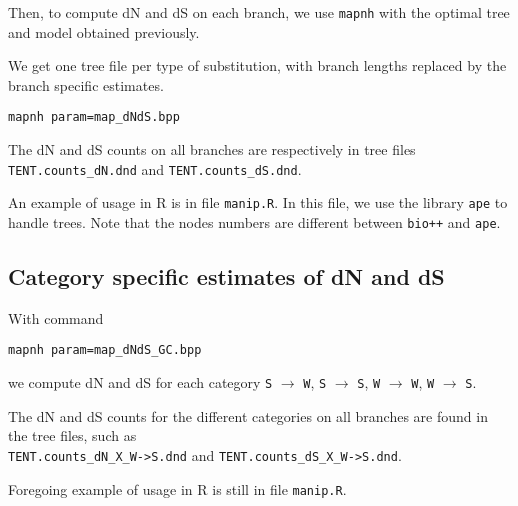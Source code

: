 \documentclass[11pt, a4paper]{article}
\begin{document}
Then, to compute dN and dS on each branch, we use \texttt{mapnh} with
the optimal tree and model obtained previously.

We get one tree file per type of substitution, with branch lengths
replaced by the branch specific estimates.

\begin{verbatim}
mapnh param=map_dNdS.bpp
\end{verbatim}

The dN and dS counts on all branches are respectively in tree files
\\ 
\verb|TENT.counts_dN.dnd| and
\verb|TENT.counts_dS.dnd|.

\smallskip

An example of usage in R is in file \texttt{manip.R}. In this file, we
use the library \texttt{ape} to handle trees. Note that the nodes
numbers are different between \texttt{bio++} and \texttt{ape}.

\subsection*{Category specific estimates of dN and dS}

With command

\begin{verbatim}
mapnh param=map_dNdS_GC.bpp
\end{verbatim}

we compute dN and dS for each category \texttt{S} $
\rightarrow $ \texttt{W}, \texttt{S} $
\rightarrow $ \texttt{S}, \texttt{W} $
\rightarrow $ \texttt{W}, \texttt{W} $
\rightarrow $ \texttt{S}.

The dN and dS counts for the different categories on all branches
are found in the tree files, such as \\ \verb|TENT.counts_dN_X_W->S.dnd| and
\verb|TENT.counts_dS_X_W->S.dnd|.

\medskip

Foregoing example of usage in R is still in file \texttt{manip.R}.
\end{document}
